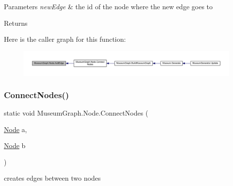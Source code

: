 \begin{DoxyParams}{Parameters}
{\em new\+Edge} & the id of the node where the new edge goes to\\
\hline
\end{DoxyParams}
\begin{DoxyReturn}{Returns}

\end{DoxyReturn}
Here is the caller graph for this function\+:
\nopagebreak
\begin{figure}[H]
\begin{center}
\leavevmode
\includegraphics[width=350pt]{class_museum_graph_1_1_node_adecbc3b471d15c5480d4c13e9502ac27_icgraph}
\end{center}
\end{figure}
\mbox{\label{class_museum_graph_1_1_node_afc85f1140ee37f6365863f34ac3482bc}} 
\subsubsection{\texorpdfstring{Connect\+Nodes()}{ConnectNodes()}}
{\footnotesize\ttfamily static void Museum\+Graph.\+Node.\+Connect\+Nodes (\begin{DoxyParamCaption}\item[{\mbox{\hyperlink{class_museum_graph_1_1_node}{Node}}}]{a,  }\item[{\mbox{\hyperlink{class_museum_graph_1_1_node}{Node}}}]{b }\end{DoxyParamCaption})\hspace{0.3cm}{\ttfamily [static]}}



creates edges between two nodes 

